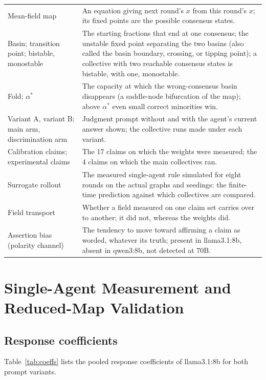 \documentclass{ieeeaccess}
\newcommand{\astar}{\alpha^{*}}
\begin{document}
\begin{table}[!t]
\begin{tabular}{@{}>{\raggedright\arraybackslash}p{}p{}@{}}
Mean-field map & An equation giving next round's $x$ from this round's $x$;
its fixed points are the possible consensus states. \\
Basin; transition point; bistable, monostable & The starting fractions that
end at one consensus; the unstable fixed point separating the two basins
(also called the basin boundary, crossing, or tipping point); a collective
with two reachable
consensus states is bistable, with one, monostable. \\
Fold; $\astar$ & The capacity at which the wrong-consensus basin disappears
(a saddle-node bifurcation of the map); above $\astar$ even small correct
minorities win. \\
Variant A, variant B; main arm, discrimination arm & Judgment prompt without
and with the agent's current answer shown; the collective runs made under
each variant. \\
Calibration claims; experimental claims & The 17 claims on which the weights
were measured; the 4 claims on which the main collectives ran. \\
Surrogate rollout & The measured single-agent rule simulated for eight
rounds on the actual graphs and seedings: the finite-time prediction
against which collectives are compared. \\
Field transport & Whether a field measured on one claim set carries over to
another; it did not, whereas the weights did. \\
Assertion bias (polarity channel) & The tendency to move toward affirming a
claim as worded, whatever its truth; present in llama3.1:8b, absent in
qwen3:8b, not detected at 70B. \\
\bottomrule
\end{tabular}
\end{table}


\section{Single-Agent Measurement and Reduced-Map Validation}\label{app:single}

\subsection{Response coefficients}
Table~\ref{tab:coeffs} lists the pooled response coefficients of llama3.1:8b for both prompt variants.
\begin{table}[!t]
\caption{Pooled response coefficients (llama3.1:8b; claim-clustered 95\% intervals).}
\label{tab:coeffs}
\centering\small
\resizebox{\columnwidth}{!}{}
\end{table}
\end{document}
